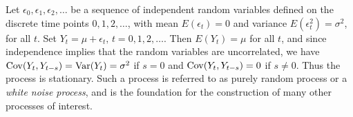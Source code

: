 \begin{ex} \label{ex:whitenoise} Let $\epsilon_0, \epsilon_1, \epsilon_2, \ldots$ be a sequence of independent random variables defined on the discrete time points $0,1, 2, \ldots$, with mean $E(\epsilon_{t})= 0$ and variance $E(\epsilon_{t}^2)= \sigma^2$, for all $t$. Set $Y_t = \mu + \epsilon_t, \, t= 0, 1, 2, \ldots$. Then $E(Y_t)= \mu$ for all $t$, and since independence implies that the random variables are uncorrelated, we have $\operatorname{Cov}(Y_t,Y_{t-s})= \operatorname{Var}(Y_t)= \sigma^2$ if $s=0$ and $\operatorname{Cov}(Y_t,Y_{t-s})= 0$ if $s \neq 0$. Thus the process is stationary. Such a process is referred to as purely random process or a \emph{white noise process}, and is the foundation for the construction of many other processes of interest. \xqed
\end{ex}


